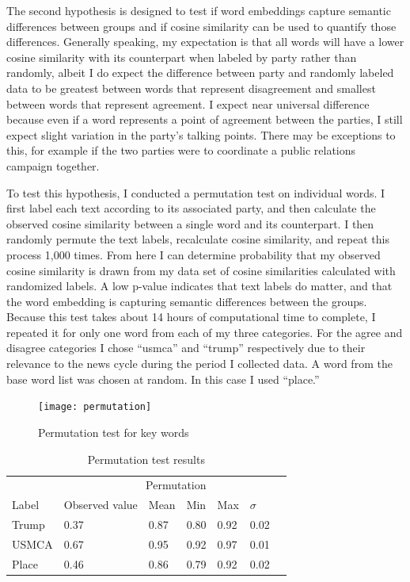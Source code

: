 \documentclass[../embeddings.tex]{subfiles}
\begin{document}
The second hypothesis is designed to test if word embeddings capture semantic differences between groups and if cosine similarity can be used to quantify those differences. Generally speaking, my expectation is that all words will have a lower cosine similarity with its counterpart when labeled by party rather than randomly, albeit I do expect the difference between party and randomly labeled data to be greatest between words that represent disagreement and smallest between words that represent agreement. I expect near universal difference because even if a word represents a point of agreement between the parties, I still expect slight variation in the party's talking points. There may be exceptions to this, for example if the two parties were to coordinate a public relations campaign together.

To test this hypothesis, I conducted a permutation test on individual words. I first label each text according to its associated party, and then calculate the observed cosine similarity between a single word and its counterpart. I then randomly permute the text labels, recalculate cosine similarity, and repeat this process 1,000 times. From here I can determine probability that my observed cosine similarity is drawn from my data set of cosine similarities calculated with randomized labels. A low p-value indicates that text labels do  matter, and that the word embedding is capturing semantic differences between the groups. Because this test takes about 14 hours of computational time to complete, I repeated it for only one word from each of my three categories. For the agree and disagree categories I chose ``usmca'' and ``trump'' respectively due to their relevance to the news cycle during the period I collected data. A word from the base word list was chosen at random. In this case I used ``place.''

\begin{figure}[h]
  \centering
  \texttt{[image: permutation]}
  \caption{Permutation test for key words}
  \label{fig:permutation}
\end{figure}

\begin{table}[h]
    \caption{Permutation test results}
    \begin{tabular}{lllllll}
      \toprule
        \multicolumn{4}{r}{Permutation}                   \\
        \cmidrule(r){3-6}
      Label    & Observed value & Mean & Min  & Max  & $\sigma$\\
      \midrule
      Trump    & 0.37           & 0.87 & 0.80 & 0.92 & 0.02 \\
      USMCA    & 0.67           & 0.95 & 0.92 & 0.97 & 0.01 \\
      Place    & 0.46           & 0.86 & 0.79 & 0.92 & 0.02 \\
      \bottomrule
    \end{tabular}
    \label{table:perm}
\end{table}
\end{document}
